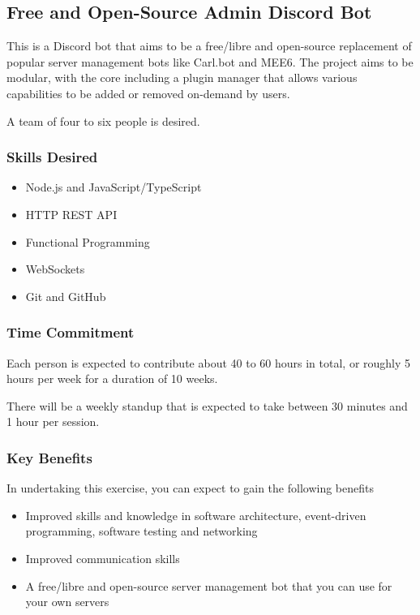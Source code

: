 \subsection{Free and Open-Source Admin Discord Bot}

This is a Discord bot that aims to be a free/libre and open-source replacement of popular server management bots like Carl.bot and MEE6.  The project aims to be modular, with the core including a plugin manager that allows various capabilities to be added or removed on-demand by users.

A team of four to six people is desired.

\subsubsection*{Skills Desired}

\begin{multicols}{2}
\begin{itemize}
    \item Node.js and JavaScript/TypeScript
    \item HTTP REST API
    \item Functional Programming
    \item WebSockets
    \item Git and GitHub
\end{itemize}
\end{multicols}

\subsubsection*{Time Commitment}

Each person is expected to contribute about 40 to 60 hours in total, or roughly 5 hours per week for a duration of 10 weeks.

There will be a weekly standup that is expected to take between 30 minutes and 1 hour per session.

\subsubsection*{Key Benefits}

In undertaking this exercise, you can expect to gain the following benefits

\begin{itemize}
    \item Improved skills and knowledge in software architecture, event-driven programming, software testing and networking
    \item Improved communication skills
    \item A free/libre and open-source server management bot that you can use for your own servers
\end{itemize}
